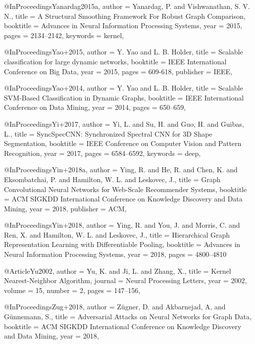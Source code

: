 @InProceedings{Yanardag2015a,
  author    = {Yanardag, P. and Vishwanathan, S. V. N.},
  title     = {A Structural Smoothing Framework For Robust Graph Comparison},
  booktitle = {Advances in Neural Information Processing Systems},
  year      = {2015},
  pages     = {2134--2142},
  keywords  = {kernel},
}

@InProceedings{Yao+2015,
  author    = {Y. Yao and L. B. Holder},
  title     = {Scalable classification for large dynamic networks},
  booktitle = {IEEE International Conference on Big Data},
  year      = {2015},
  pages     = {609-618},
  publisher = {IEEE},
}

@InProceedings{Yao+2014,
  author    = {Y. Yao and L. B. Holder},
  title     = {Scalable {SVM}-Based Classification in Dynamic Graphs},
  booktitle = {IEEE International Conference on Data Mining},
  year      = {2014},
  pages     = {650--659},
}

@InProceedings{Yi+2017,
  author    = {Yi, L. and Su, H. and Guo, H. and Guibas, L.},
  title     = {SyncSpecCNN: Synchronized Spectral CNN for 3D Shape Segmentation},
  booktitle = {IEEE Conference on Computer Vision and Pattern Recognition},
  year      = {2017},
  pages     = {6584--6592},
  keywords  = {deep},
}

@InProceedings{Yin+2018a,
  author    = {Ying, R. and He, R. and Chen, K. and Eksombatchai, P. and Hamilton, W. L. and Leskovec, J.},
  title     = {Graph Convolutional Neural Networks for Web-Scale Recommender Systems},
  booktitle = {ACM SIGKDD International Conference on Knowledge Discovery and Data Mining},
  year      = {2018},
  publisher = {ACM},
}

@InProceedings{Yin+2018,
  author    = {Ying, R. and You, J. and Morris, C. and Ren, X. and Hamilton, W. L. and Leskovec, J.},
  title     = {Hierarchical Graph Representation Learning with Differentiable Pooling},
  booktitle = {Advances in Neural Information Processing Systems},
  year      = {2018},
  pages     = {4800--4810}
}

@Article{Yu2002,
  author  = {Yu, K. and Ji, L. and Zhang, X.},
  title   = {Kernel Nearest-Neighbor Algorithm},
  journal = {Neural Processing Letters},
  year    = {2002},
  volume  = {15},
  number  = {2},
  pages   = {147--156},
}

@InProceedings{Zug+2018,
  author    = {Z{\"u}gner, D. and Akbarnejad, A, and G{\"u}nnemann, S.},
  title     = {Adversarial Attacks on Neural Networks for Graph Data},
  booktitle = {ACM SIGKDD International Conference on Knowledge Discovery and Data Mining},
  year      = {2018},
}

